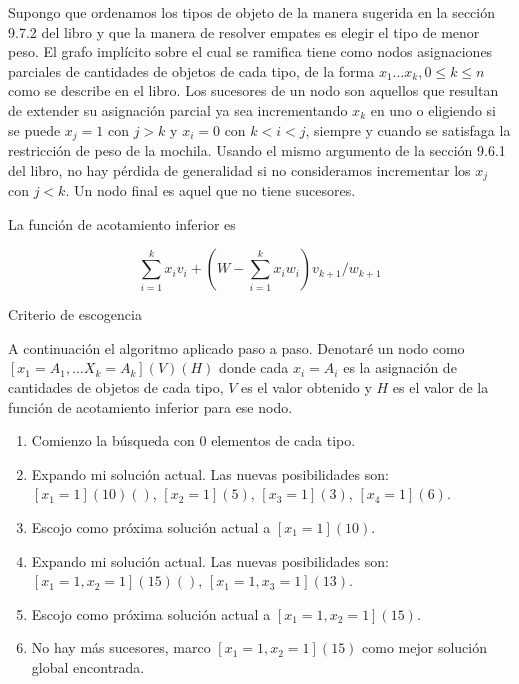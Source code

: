 \documentclass{article}
\begin{document}
Supongo que ordenamos los tipos de objeto de la manera sugerida en la sección 9.7.2 del libro y que la manera
de resolver empates es elegir el tipo de menor peso.
El grafo implícito sobre el cual se ramifica tiene como nodos asignaciones parciales de cantidades
de objetos de cada tipo, de la forma $x_1 \ldots x_k, 0 \leq k \leq n$ como se describe en el libro. Los sucesores
de un nodo son aquellos que resultan de extender su asignación parcial ya sea incrementando $x_k$ en uno o
eligiendo si se puede $x_j = 1$ con $j > k$ y $x_i = 0$ con $k < i < j$, siempre y cuando se satisfaga la 
restricción de peso de la mochila.
Usando el mismo argumento de la sección 9.6.1 del libro, no hay pérdida de generalidad
si no consideramos incrementar los $x_j$ con $j < k$. Un nodo final es aquel que no tiene sucesores.

La función de acotamiento inferior es

$$
\sum_{i=1}^k x_i v_i + \left( W - \sum_{i=1}^k x_i w_i \right) v_{k+1}/w_{k+1}
$$

Criterio de escogencia

A continuación el algoritmo aplicado paso a paso. Denotaré un nodo como $[x_1 = A_1, \ldots X_k = A_k] (V)(H)$ donde
cada $x_i = A_i$ es la asignación de cantidades de objetos de cada tipo, $V$ es el valor obtenido y $H$ es el valor
de la función de acotamiento inferior para ese nodo.

\renewcommand{\labelenumi}{\arabic{enumi}.}

\begin{enumerate}

\item Comienzo la búsqueda con $0$ elementos de cada tipo.
\item Expando mi solución actual. Las nuevas posibilidades son: $[x_1=1] (10)()$, $[x_2=1] (5)$, $[x_3=1] (3)$, $[x_4=1] (6)$.
\item Escojo como próxima solución actual a $[x_1=1] (10)$.
\item Expando mi solución actual. Las nuevas posibilidades son: $[x_1=1,x_2=1] (15)()$, $[x_1=1,x_3=1] (13)$.
\item Escojo como próxima solución actual a $[x_1=1,x_2=1] (15)$.
\item No hay más sucesores, marco $[x_1=1,x_2=1] (15)$ como mejor solución global encontrada.

\end{enumerate}
\end{document}

